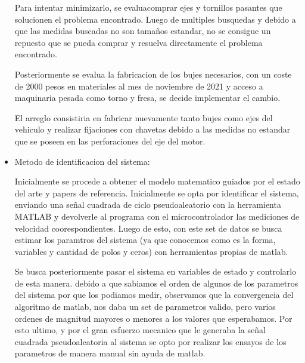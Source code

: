 \begin{itemize}
        Para intentar minimizarlo, se evaluacomprar ejes y tornillos pasantes que solucionen el problema encontrado. Luego de multiples busquedas y debido a que las medidas buscadas no son tamaños estandar, no se consigue un repuesto que se pueda comprar y resuelva directamente el problema encontrado.

        Posteriormente se evalua la fabricacion de los bujes necesarios, con un coste de 2000 pesos en materiales al mes de noviembre de 2021 y acceso a maquinaria pesada como torno y fresa, se decide implementar el cambio.

        El arreglo consistiria en fabricar nuevamente tanto bujes como ejes del vehiculo y realizar fijaciones con chavetas debido a las medidas no estandar que se poseen en las perforaciones del eje del motor.

        \item Metodo de identificacion del sistema:

        Inicialmente se procede a obtener el modelo matematico guiados por el estado del arte y papers de referencia.
        Inicialmente se opta por identificar el sistema, enviando una señal cuadrada de ciclo pseudoaleatorio con la herramienta MATLAB y devolverle al programa con el microcontrolador las mediciones de velocidad coorespondientes. Luego de esto, con este set de datos se busca estimar los paramtros del sistema (ya que conocemos como es la forma, variables y cantidad de polos y ceros) con herramientas propias de matlab.

        Se busca posteriormente pasar el sistema en variables de estado y controlarlo de esta manera. debido a que sabiamos el orden de algunos de los parametros del sistema por que los podiamos medir, observamos que la convergencia del algoritmo de matlab, nos daba un set de parametros valido, pero varios ordenes de magnitud mayores o menores a los valores que esperabamos. Por esto ultimo, y por el gran esfuerzo mecanico que le generaba la señal cuadrada pseudoaleatoria al sistema se opto por realizar los ensayos de los parametros de manera manual sin ayuda de matlab.

    \end{itemize}

